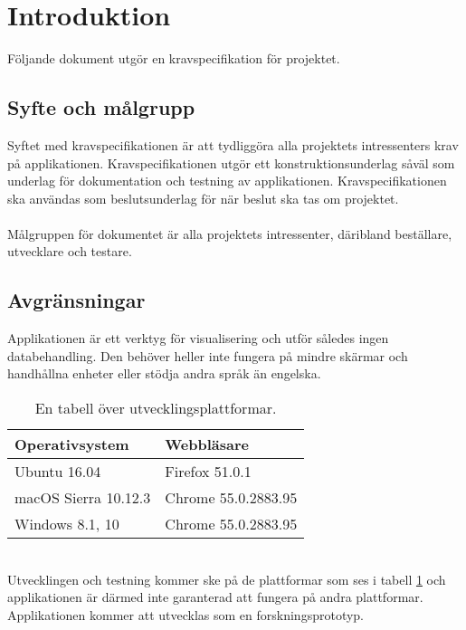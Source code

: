 \section{Introduktion}
Följande dokument utgör en kravspecifikation för projektet. 
\subsection{Syfte och målgrupp}
Syftet med kravspecifikationen är att tydliggöra alla projektets intressenters krav på applikationen. Kravspecifikationen utgör ett konstruktionsunderlag såväl som underlag för dokumentation och testning av applikationen. Kravspecifikationen ska användas som beslutsunderlag för när beslut ska tas om projektet.
\\
\\
Målgruppen för dokumentet är alla projektets intressenter, däribland beställare, utvecklare och testare. 
\subsection{Avgränsningar}
Applikationen är ett verktyg för visualisering och utför således ingen databehandling. Den behöver heller inte fungera på mindre skärmar och handhållna enheter eller stödja andra språk än engelska.

\begin{table}[h!]
  \centering
  \caption{En tabell över utvecklingsplattformar.}
  \def\arraystretch{1.5}
  \begin{adjustbox}{max width=\textwidth}
    \begin{tabularx}{\textwidth}{ | l | X | }
      \hline
      \textbf{Operativsystem} & \textbf{Webbläsare} \\
      \hline
      Ubuntu 16.04 & Firefox 51.0.1 \\
      \hline
      macOS Sierra 10.12.3 & Chrome 55.0.2883.95 \\
      \hline
      Windows 8.1, 10 & Chrome 55.0.2883.95 \\
      \hline
    \end{tabularx}
  \end{adjustbox}
  \label{tab:utvecklingsplattformar}
\end{table}
\ \\
Utvecklingen och testning kommer ske på de plattformar som ses i tabell \ref{tab:utvecklingsplattformar} och applikationen är därmed inte garanterad att fungera på andra plattformar. Applikationen kommer att utvecklas som en forskningsprototyp.

